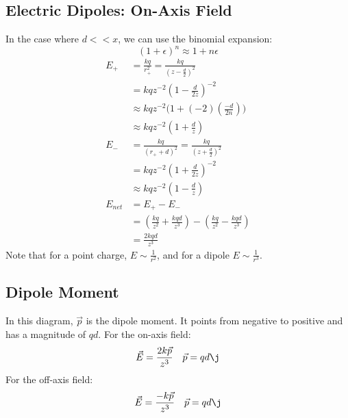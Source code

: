 \documentclass{math}
\begin{document}
\subsection*{Electric Dipoles: On-Axis Field}
\begin{center}
\end{center}
In the case where \( d << x \), we can use the binomial expansion:
\[ (1+\epsilon)^n \approx 1+n\epsilon \]
\begin{align*}
  E_{+} &= \frac{kq}{r_{+}^2} = \frac{kq}{(z-\frac{d}{2})^2} \\
  &= kqz^{-2}(1-\frac{d}{2z})^{-2} \\
  &\approx kqz^{-2}\bigg(1+(-2)(\frac{-d}{2n})\bigg) \\
  &\approx kqz^{-2}(1+\frac{d}{z}) \\
  E_{-} &= \frac{kq}{(r_{+}+d)^2} = \frac{kq}{(z+\frac{d}{2})^2} \\
  &= kqz^{-2}(1+\frac{d}{2z})^{-2} \\
  &\approx kqz^{-2}(1-\frac{d}{z}) \\
  E_{net} &= E_{+}-E_{-} \\
  &= (\frac{kq}{z^2}+\frac{kqd}{z^3})-(\frac{kq}{z^2}-\frac{kqd}{z^3}) \\
  &= \frac{2kqd}{z^3}
\end{align*}
Note that for a point charge, \( E\sim\frac{1}{r^2} \), and for a dipole
\( E\sim\frac{1}{r^3} \).

\subsection*{Dipole Moment}
\begin{center}
\end{center}
In this diagram, \( \vec{p} \) is the dipole moment. It points from negative to
positive and has a magnitude of \( qd \). For the on-axis field:
\[ \vec{E} = \frac{2k\vec{p}}{z^3} \quad \vec{p} = qd\j \]
For the off-axis field:
\[ \vec{E} = \frac{-k\vec{p}}{z^3} \quad \vec{p} = qd\j \]
\end{document}
